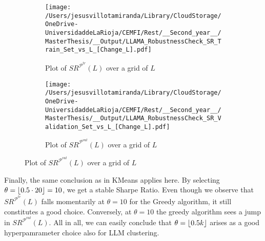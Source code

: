 \begin{figure}[H]
  \caption{Sharpe Ratios in the train and validation splits as a function of hyperparameters}
  \centering
  
  \begin{subfigure}[b]{0.46\textwidth}
    \centering
    \texttt{[image: /Users/jesusvillotamiranda/Library/CloudStorage/OneDrive-UniversidaddeLaRioja/CEMFI/Rest/\_\_Second\_year\_\_/MasterThesis/\_\_Output/LLAMA\_RobustnessCheck\_SR\_Train\_Set\_vs\_L\_[Change\_L].pdf]}
    \caption{Plot of $SR^{\mathcal P^{tr}}(L)$ over a grid of $L$}
    \label{fig:LLM_hyp_1}
    
  \end{subfigure}
  \hspace{0.05\textwidth} %
  \begin{subfigure}[b]{0.46\textwidth}
    \centering
    \texttt{[image: /Users/jesusvillotamiranda/Library/CloudStorage/OneDrive-UniversidaddeLaRioja/CEMFI/Rest/\_\_Second\_year\_\_/MasterThesis/\_\_Output/LLAMA\_RobustnessCheck\_SR\_Validation\_Set\_vs\_L\_[Change\_L].pdf]}
    \caption{Plot of $SR^{\mathcal P^{val}}(L)$ over a grid of $L$}
    \label{fig:LLM_hyp_2}
  \end{subfigure}
  
  \label{fig:LLM_hyperparameter_justification_L}
\end{figure}

Finally, the same conclusion as in KMeans applies here. By selecting $\theta=\lfloor 0.5\cdot 20 \rfloor=10$, we get a stable Sharpe Ratio. Even though we observe that $SR^{\mathcal P^{tr}}(L)$ falls momentarily at $\theta=10$ for the Greedy algorithm, it still constitutes a good choice. Conversely, at $\theta=10$ the greedy algorithm sees a jump in $SR^{\mathcal P^{val}}(L)$. All in all, we can easily conclude that $\theta=\lfloor 0.5k \rfloor$ arises as a good hyperpamrameter choice also for LLM clustering.

